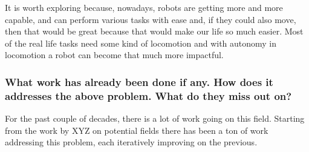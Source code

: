     It is worth exploring because, nowadays, robots are getting more and more capable, and can perform various tasks with ease and, if they could also move, then that would be great because that would make our life so much easier. Most of the real life tasks need some kind of locomotion and with autonomy in locomotion a robot can become that much more impactful.

\subsubsection*{What work has already been done if any. How does it addresses the above problem. What do they miss out on?}
    For the past couple of decades, there is a lot of work going on this field. Starting from the work by XYZ on potential fields there has been a ton of work addressing this problem, each iteratively improving on the previous. 
